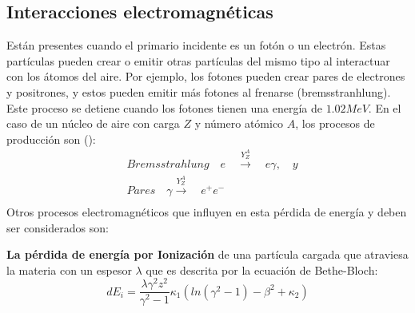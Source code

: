 \subsection{Interacciones electromagnéticas}
Están presentes cuando el primario incidente es un fotón o un electrón. Estas partículas pueden crear o emitir otras partículas del mismo tipo al interactuar con los átomos del aire. Por ejemplo, los fotones pueden crear pares de electrones y positrones, y estos pueden emitir más fotones al frenarse (bremsstranhlung). Este proceso se detiene cuando los fotones tienen una energía de $1.02 MeV$. En el caso de un núcleo de aire con carga $Z$ y número atómico $A$, los procesos de producción son (\cite{heitler}):
\begin{equation}
\begin{split}
&Bremsstrahlung\quad e \quad \xrightarrow{Y^{A}_{Z}} \quad e\gamma ,  \quad y \\
&Pares \quad \gamma \xrightarrow{Y^{A}_{Z}} \quad e^{+}e^{-} \\
\end{split}
\end{equation} 
Otros procesos electromagnéticos que influyen en esta pérdida de energía y deben ser considerados son:

\textbf{La pérdida de energía por Ionización} de una partícula cargada que atraviesa la materia con un espesor $\lambda$ que es descrita por la ecuación de Bethe-Bloch:
\begin{equation}
dE_{i} = \frac{\lambda \gamma^{2}z^{2}}{\gamma^{2}-1}\kappa_{1}(ln(\gamma^{2}-1)- \beta^{2}+\kappa_{2})
\label{eq:eq20}
\end{equation}

